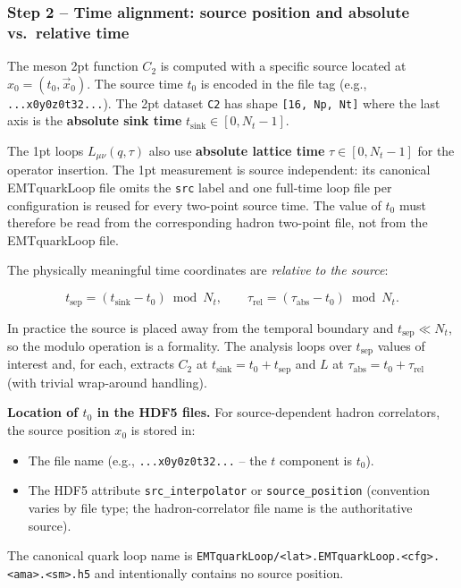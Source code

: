 \documentclass[11pt,a4paper]{article}
\newcommand{\code}[1]{\texttt{#1}}
\begin{document}
\subsubsection{Step 2 -- Time alignment: source position and absolute vs.\ relative time}
\label{sec:analysis_step2}

The meson 2pt function $C_2$ is computed with a specific source located at
$x_0 = (t_0, \vec{x}_0)$.  The source time $t_0$ is encoded in the file tag
(e.g., \code{...x0y0z0t32...}).  The 2pt dataset \code{C2} has shape
\code{[16, Np, Nt]} where the last axis is the \textbf{absolute sink time}
$t_{\text{sink}} \in [0, N_t - 1]$.

The 1pt loops $L_{\mu\nu}(q, \tau)$ also use \textbf{absolute lattice time}
$\tau \in [0, N_t - 1]$ for the operator insertion.  The 1pt measurement is
source independent: its canonical EMTquarkLoop file omits the \code{src} label and one
full-time loop file per configuration is reused for every two-point source
time.  The value of $t_0$ must therefore be read from the corresponding hadron
two-point file, not from the EMTquarkLoop file.

The physically meaningful time coordinates are \emph{relative to the source}:

\begin{equation}\label{eq:time_alignment}
  t_{\text{sep}} = (t_{\text{sink}} - t_0) \bmod N_t, \qquad
  \tau_{\text{rel}} = (\tau_{\text{abs}} - t_0) \bmod N_t.
\end{equation}

In practice the source is placed away from the temporal boundary and
$t_{\text{sep}} \ll N_t$, so the modulo operation is a formality.
The analysis loops over $t_{\text{sep}}$ values of interest and, for each,
extracts $C_2$ at $t_{\text{sink}} = t_0 + t_{\text{sep}}$ and $L$ at
$\tau_{\text{abs}} = t_0 + \tau_{\text{rel}}$ (with trivial wrap-around handling).

\textbf{Location of $t_0$ in the HDF5 files.}
For source-dependent hadron correlators, the source position $x_0$ is stored in:
\begin{itemize}[nosep]
  \item The file name (e.g., \code{...x0y0z0t32...} -- the $t$ component is $t_0$).
  \item The HDF5 attribute \code{src\_interpolator} or \code{source\_position}
    (convention varies by file type; the hadron-correlator file name is the
    authoritative source).
\end{itemize}
The canonical quark loop name is
\code{EMTquarkLoop/<lat>.EMTquarkLoop.<cfg>.<ama>.<sm>.h5} and intentionally contains no
source position.
\end{document}

